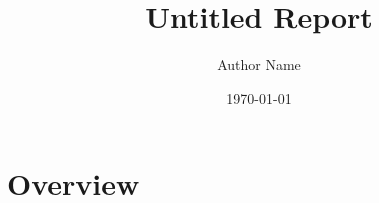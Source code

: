 \documentclass[11pt]{report}
\title{Untitled Report}
\author{Author Name}
\date{\today}
\begin{document}
\maketitle
\tableofcontents

\chapter{Overview}



\end{document}
